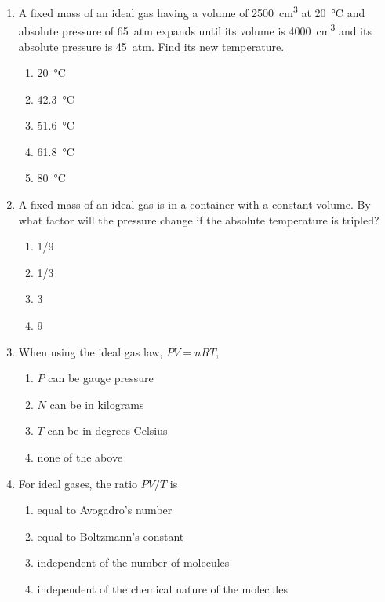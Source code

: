 \documentclass{../../oss-apphys}
\begin{document}
\begin{multicols}{2}
\begin{enumerate}[leftmargin=18pt,start=24]
  \item A fixed mass of an ideal gas having a volume of \SI{2500}{cm^3} at
    \SI{20}{\celsius} and absolute pressure of \SI{65}{atm} expands until its
    volume is \SI{4000}{cm^3} and its absolute pressure is \SI{45}{atm}. Find
    its new temperature.
    \begin{enumerate}[noitemsep,topsep=0pt,leftmargin=18pt,label=(\Alph*)]
    \item\SI{20}{\celsius}
    \item\SI{42.3}{\celsius}
    \item\SI{51.6}{\celsius}
    \item\SI{61.8}{\celsius}
    \item\SI{80}{\celsius}
    \end{enumerate}

  \item A fixed mass of an ideal gas is in a container with a constant volume.
    By what factor will the pressure change if the absolute temperature is
    tripled?
    \begin{enumerate}[noitemsep,topsep=0pt,leftmargin=18pt,label=(\Alph*)]
    \item 1/9
    \item 1/3
    \item 3
    \item 9
    \end{enumerate}

  \item When using the ideal gas law, $PV=nRT$,
    \begin{enumerate}[noitemsep,topsep=0pt,leftmargin=18pt,label=(\Alph*)]
    \item $P$ can be gauge pressure
    \item $N$ can be in kilograms
    \item $T$ can be in degrees Celsius
    \item none of the above
    \end{enumerate}

    \columnbreak
    
  \item For ideal gases, the ratio $PV/T $ is
    \begin{enumerate}[noitemsep,topsep=0pt,leftmargin=18pt,label=(\Alph*)]
    \item equal to Avogadro's number
    \item equal to Boltzmann's constant
    \item independent of the number of molecules
    \item independent of the chemical nature of the molecules
    \end{enumerate}


\end{enumerate}
\end{multicols}
\end{document}
